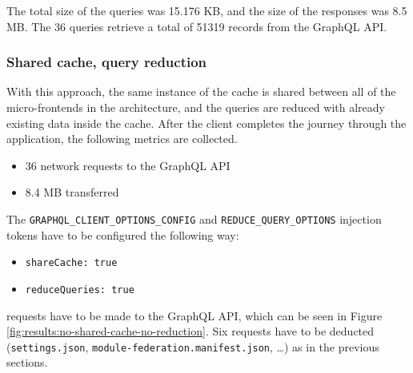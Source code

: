 \noindent The total size of the queries was 15.176 KB, and the size of the responses was 8.5 MB. The 36 queries retrieve a total of 51319 records from the GraphQL \ac{API}.

\subsubsection{Shared cache, query reduction}\label{subsubsection:results:performance-measurement:separate-cache-reduction}

With this approach, the same instance of the cache is shared between all of the micro-frontends in the architecture, and the queries are reduced with already existing data inside the cache. After the client completes the journey through the application, the following metrics are collected.

\begin{itemize}
  \item 36 network requests to the GraphQL \ac{API}
  \item 8.4 MB transferred
\end{itemize}

\noindent The \texttt{GRAPHQL\_CLIENT\_OPTIONS\_CONFIG} and \texttt{REDUCE\_QUERY\_OPTIONS} injection tokens have to be configured the following way:

\begin{itemize}
  \item \texttt{shareCache: true}
  \item \texttt{reduceQueries: true}
\end{itemize}

 requests have to be made to the GraphQL \ac{API}, which can be seen in Figure \ref{fig:results:no-shared-cache-no-reduction}. Six requests have to be deducted (\texttt{settings.json}, \texttt{module-federation.manifest.json}, \dots) as in the previous sections.

